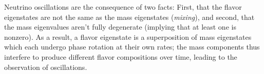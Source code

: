 \documentclass[../thesis.tex]{subfiles}
\begin{document}
Neutrino oscillations are the consequence of two facts: First, that the flavor
eigenstates are not the same as the mass eigenstates (\emph{mixing}), and
second, that the mass eigenvalues aren't fully degenerate (implying that at
least one is nonzero). As a result, a flavor eigenstate is a superposition of
mass eigenstates which each undergo phase rotation at their own rates; the mass
components thus interfere to produce different flavor compositions over time,
leading to the observation of oscillations.

\newcommand\upmns{\ensuremath{%
    U_\mathrm{PMNS}}} \newcommand\flavcol{\ensuremath{%
    \begin{pmatrix} {\nu_e} \\ {\nu_\mu} \\ {\nu_\tau} \end{pmatrix}}}
\newcommand\masscol{\ensuremath{%
    \begin{pmatrix} \nu_1 \\ \nu_2 \\ \nu_3 \end{pmatrix}}}
\newcommand\upmnsSimple{\ensuremath{%
    \begin{pmatrix} U_{e 1} & U_{e 2} & U_{e 3} \\ U_{\mu 1} & U_{\mu 2} &
      U_{\mu 3} \\ U_{\tau 1} & U_{\tau 2} & U_{\tau 3} \end{pmatrix}}}
\newcommand\cee[1]{\ensuremath{%
    c_{#1}}} \newcommand\ess[1]{\ensuremath{%
    s_{#1}}} \newcommand\upmnsFactored{\ensuremath{%
    \begin{pmatrix} 1 & 0 & 0 \\ 0 & \cee{23} & \ess{23} \\ 0 & -\ess{23} &
      \cee{23} \end{pmatrix}%
    \begin{pmatrix} \cee{13} & 0 & \ess{13}e^{-i\delta_\text{CP}} \\ 0 & 1 & 0
      \\ -\ess{13}e^{i\delta_\text{CP}} & 0 & \cee{13} \end{pmatrix}%
    \begin{pmatrix} \cee{12} & \ess{12} & 0 \\ -\ess{12} & \cee{12} & 0 \\ 0 & 0
      & 1 \end{pmatrix}}} \newcommand\upmnsFull{\ensuremath{%
    \begin{pmatrix} c_{12}c_{13} & s_{12} c_{13} & s_{13}e^{-i\delta_\text{CP}}
      \\%
      -s_{12}c_{23} - c_{12}s_{23}s_{13}e^{i\delta_\text{CP}} & c_{12}c_{23} -
      s_{12}s_{23}s_{13}e^{i\delta_\text{CP}} & s_{23}c_{13}\\%
      s_{12}s_{23} - c_{12}c_{23}s_{13}e^{i\delta_\text{CP}} & -c_{12}s_{23} -
      s_{12}c_{23}s_{13}e^{i\delta_\text{CP}} & c_{23}c_{13} \end{pmatrix}}}
\newcommand*\mathcmd[2]{\newcommand#1{\ensuremath{#2}}}
\mathcmd{\tAB}{\theta_{12}}
\mathcmd{\tBC}{\theta_{23}}
\mathcmd{\tAC}{\theta_{13}}
\mathcmd{\dcp}{\delta_\text{CP}}
\end{document}
